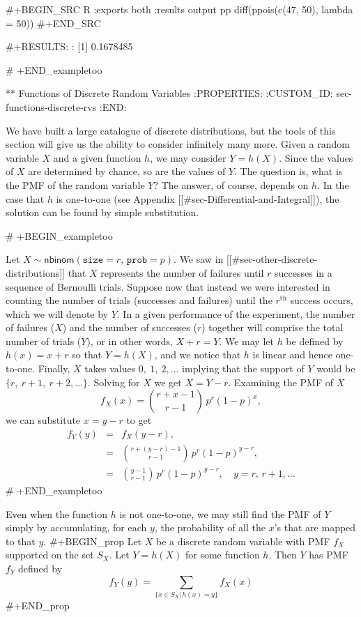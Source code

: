 {#+BEGIN_SRC R :exports both :results output pp  
diff(ppois(c(47, 50), lambda = 50))
#+END_SRC

#+RESULTS:
: [1] 0.1678485

# +END_exampletoo

** Functions of Discrete Random Variables
:PROPERTIES:
:CUSTOM_ID: sec-functions-discrete-rvs
:END:

We have built a large catalogue of discrete distributions, but the
tools of this section will give us the ability to consider infinitely
many more. Given a random variable \(X\) and a given function \(h\),
we may consider \(Y=h(X)\). Since the values of \(X\) are determined
by chance, so are the values of \(Y\). The question is, what is the
PMF of the random variable \(Y\)? The answer, of course, depends on
\(h\). In the case that \(h\) is one-to-one (see Appendix
[[#sec-Differential-and-Integral]]), the solution can be found by simple
substitution.

# +BEGIN_exampletoo

Let \(X\sim\mathsf{nbinom}(\mathtt{size}=r,\,\mathtt{prob}=p)\). We
saw in [[#sec-other-discrete-distributions]] that \(X\) represents the number
of failures until \(r\) successes in a sequence of Bernoulli
trials. Suppose now that instead we were interested in counting the
number of trials (successes and failures) until the
\(r^{\mathrm{th}}\) success occurs, which we will denote by \(Y\). In
a given performance of the experiment, the number of failures (\(X\))
and the number of successes (\(r\)) together will comprise the total
number of trials (\(Y\)), or in other words, \(X+r=Y\). We may let
\(h\) be defined by \(h(x)=x+r\) so that \(Y=h(X)\), and we notice
that \(h\) is linear and hence one-to-one. Finally, \(X\) takes values
\(0,\ 1,\ 2,\ldots\) implying that the support of \(Y\) would be \(\{
r,\ r+1,\ r+2,\ldots \}\). Solving for \(X\) we get
\(X=Y-r\). Examining the PMF of \(X\)
\begin{equation}
f_{X}(x)={r+x-1 \choose r-1}\, p^{r}(1-p)^{x},
\end{equation}
we can substitute \( x = y - r \) to get
\begin{eqnarray*}
f_{Y}(y) & = & f_{X}(y-r),\\
 & = & {r+(y-r)-1 \choose r-1}\, p^{r}(1-p)^{y-r},\\
 & = & {y-1 \choose r-1}\, p^{r}(1-p)^{y-r},\quad y=r,\, r+1,\ldots
\end{eqnarray*}
# +END_exampletoo

Even when the function \(h\) is not one-to-one, we may still find the
PMF of \(Y\) simply by accumulating, for each \(y\), the probability
of all the \(x\)'s that are mapped to that \(y\).
#+BEGIN_prop
Let \(X\) be a discrete random variable with PMF \(f_{X}\) supported
on the set \(S_{X}\). Let \(Y=h(X)\) for some function \(h\). Then
\(Y\) has PMF \(f_{Y}\) defined by
\begin{equation}
f_{Y}(y)=\sum_{\{x\in S_{X}|\, h(x)=y\}}f_{X}(x)
\end{equation}
#+END_prop

}
